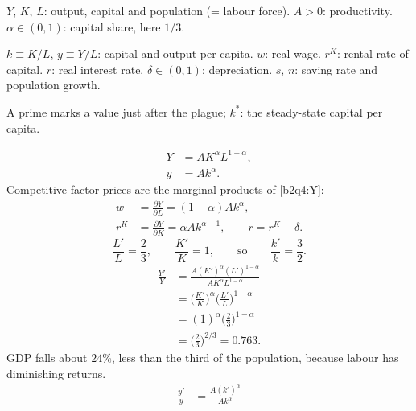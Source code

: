 \begin{sol}
\begin{notacao}
\item $Y$, $K$, $L$: output, capital and population (= labour force). $A>0$: productivity. $\alpha\in(0,1)$: capital share, here $1/3$.
\item $k\equiv K/L$, $y\equiv Y/L$: capital and output per capita. $w$: real wage. $r^K$: rental rate of capital.
$r$: real interest rate. $\delta\in(0,1)$: depreciation. $s$, $n$: saving rate and population growth.
\item A prime marks a value just after the plague; $k^*$: the steady-state capital per capita.
\end{notacao}
\begin{align}
Y&=AK^{\alpha}L^{1-\alpha}, \label{b2q4:Y}\\
y&=Ak^{\alpha}. \label{b2q4:y}
\end{align}
Competitive factor prices are the marginal products of \eqref{b2q4:Y}:
\begin{align}
w&=\frac{\partial Y}{\partial L}=(1-\alpha)Ak^{\alpha}, \label{b2q4:w}\\
r^K&=\frac{\partial Y}{\partial K}=\alpha Ak^{\alpha-1},\qquad r=r^K-\delta. \label{b2q4:rK}
\end{align}
\begin{equation}
\frac{L'}{L}=\frac23,\qquad \frac{K'}{K}=1,\qquad\text{so}\qquad \frac{k'}{k}=\frac32. \label{b2q4:shock}
\end{equation}
\begin{align*}
\frac{Y'}{Y}&=\frac{A(K')^{\alpha}(L')^{1-\alpha}}{AK^{\alpha}L^{1-\alpha}}\\
&=\Big(\frac{K'}{K}\Big)^{\alpha}\Big(\frac{L'}{L}\Big)^{1-\alpha}\\
&=(1)^{\alpha}\Big(\frac23\Big)^{1-\alpha}\\
&=\Big(\frac23\Big)^{2/3}=0.763 .
\end{align*}
GDP falls about $24\%$, less than the third of the population, because labour has diminishing returns.
\begin{align*}
\frac{y'}{y}&=\frac{A(k')^{\alpha}}{Ak^{\alpha}}\\

\end{align*}
\end{sol}
